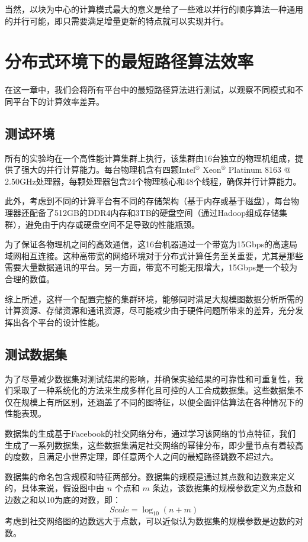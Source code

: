 当然，以块为中心的计算模式最大的意义是给了一些难以并行的顺序算法一种通用的并行可能，即只需要满足增量更新的特点就可以实现并行。



\section{分布式环境下的最短路径算法效率}
\label{sec:distribution2}

在这一章中，我们会将所有平台中的最短路径算法进行测试，以观察不同模式和不同平台下的计算效率差异。

\subsection{测试环境}

所有的实验均在一个高性能计算集群上执行，该集群由16台独立的物理机组成，提供了强大的并行计算能力。每台物理机含有四颗Intel$^\circledR$ Xeon$^\circledR$ Platinum 8163 @ 2.50GHz处理器，每颗处理器包含24个物理核心和48个线程，确保并行计算能力。

此外，考虑到不同的计算平台有不同的存储架构（基于内存或基于磁盘），每台物理器还配备了512GB的DDR4内存和3TB的硬盘空间（通过Hadoop组成存储集群），避免由于内存或硬盘空间不足导致的性能瓶颈。

为了保证各物理机之间的高效通信，这16台机器通过一个带宽为15Gbps的高速局域网相互连接。这种高带宽的网络环境对于分布式计算任务至关重要，尤其是那些需要大量数据通讯的平台。另一方面，带宽不可能无限增大，15Gbps是一个较为合理的数值。

综上所述，这样一个配置完整的集群环境，能够同时满足大规模图数据分析所需的计算资源、存储资源和通讯资源，尽可能减少由于硬件问题所带来的差异，充分发挥出各个平台的设计性能。

\subsection{测试数据集}

为了尽量减少数据集对测试结果的影响，并确保实验结果的可靠性和可重复性，我们采取了一种系统化的方法来生成多样化且可控的人工合成数据集。这些数据集不仅在规模上有所区别，还涵盖了不同的图特征，以便全面评估算法在各种情况下的性能表现。

数据集的生成基于Facebook的社交网络分布，通过学习该网络的节点特征，我们生成了一系列数据集，这些数据集满足社交网络的幂律分布，即少量节点有着较高的度数，且满足小世界定理，即任意两个人之间的最短路径跳数不超过六。

数据集的命名包含规模和特征两部分。数据集的规模是通过其点数和边数来定义的，具体来说，假设图中由 $n$ 个点和 $m$ 条边，该数据集的规模参数定义为点数和边数之和以10为底的对数，即：
\begin{equation*}
    Scale = \log_{10}(n + m)
\end{equation*}
考虑到社交网络图的边数远大于点数，可以近似认为数据集的规模参数是边数的对数。

